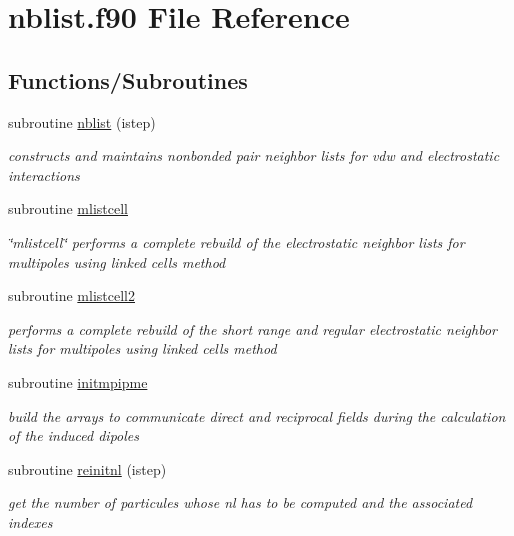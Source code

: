 \hypertarget{nblist_8f90}{\section{nblist.\-f90 File Reference}
\label{nblist_8f90}
}
\subsection*{Functions/\-Subroutines}
\begin{DoxyCompactItemize}
\item 
subroutine \hyperlink{nblist_8f90_a54d14b4bd44060d9cfa616ab89d1d723}{nblist} (istep)
\begin{DoxyCompactList}\small\item\em constructs and maintains nonbonded pair neighbor lists for vdw and electrostatic interactions \end{DoxyCompactList}\item 
subroutine \hyperlink{nblist_8f90_aac11d281d4fe2b395e56c26f4f6fb938}{mlistcell}
\begin{DoxyCompactList}\small\item\em \char`\"{}mlistcell\char`\"{} performs a complete rebuild of the electrostatic neighbor lists for multipoles using linked cells method \end{DoxyCompactList}\item 
subroutine \hyperlink{nblist_8f90_a520d12b44534e180bb851b0b3e6c3c89}{mlistcell2}
\begin{DoxyCompactList}\small\item\em performs a complete rebuild of the short range and regular electrostatic neighbor lists for multipoles using linked cells method \end{DoxyCompactList}\item 
subroutine \hyperlink{nblist_8f90_af3eb198334f3bbc5cfc70080b4b254d1}{initmpipme}
\begin{DoxyCompactList}\small\item\em build the arrays to communicate direct and reciprocal fields during the calculation of the induced dipoles \end{DoxyCompactList}\item 
subroutine \hyperlink{nblist_8f90_a1998698bfd65eb0e19836c89143e0b2c}{reinitnl} (istep)
\begin{DoxyCompactList}\small\item\em get the number of particules whose nl has to be computed and the associated indexes \end{DoxyCompactList}\item 

\end{DoxyCompactItemize}
